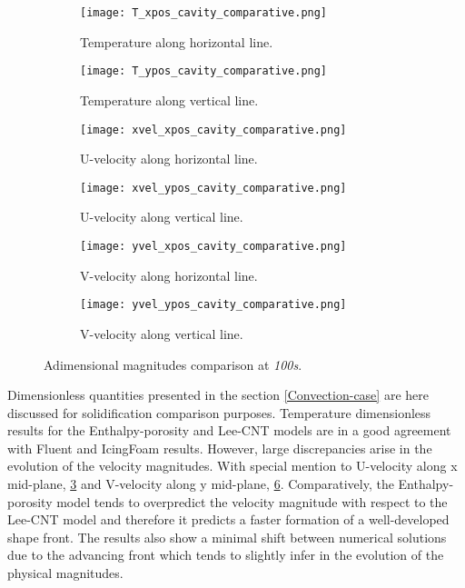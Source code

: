 \begin{figure}[h!]
	\begin{subfigure}{0.50\textwidth}
		\centering
		\texttt{[image: T\_xpos\_cavity\_comparative.png]}\hfill
		\caption{Temperature along horizontal line.} \label{3.13figa}
	\end{subfigure}
	\hfill
	\begin{subfigure}{0.50\textwidth}
		\centering
		\texttt{[image: T\_ypos\_cavity\_comparative.png]}	
		\caption{Temperature along vertical line.}\label{3.13figb}
	\end{subfigure}
	\begin{subfigure}{0.50\textwidth}
		\texttt{[image: xvel\_xpos\_cavity\_comparative.png]}\hfill
		\caption{U-velocity along horizontal line.}\label{3.13figc}
	\end{subfigure}
	\begin{subfigure}{0.50\textwidth}
		\texttt{[image: xvel\_ypos\_cavity\_comparative.png]}	
		\caption{U-velocity along vertical line.}\label{3.13figd}
	\end{subfigure}
	\begin{subfigure}{0.50\textwidth}
		\texttt{[image: yvel\_xpos\_cavity\_comparative.png]}\hfill	
		\caption{V-velocity along horizontal line.}\label{3.13fige}
	\end{subfigure}
	\begin{subfigure}{0.50\textwidth}
		\texttt{[image: yvel\_ypos\_cavity\_comparative.png]}	
		\caption{V-velocity along vertical line.}\label{3.13figf}
	\end{subfigure}
	\caption{Adimensional magnitudes comparison at \textit{100s}.}
	\label{3.13fig}
\end{figure}
\clearpage
\noindent Dimensionless quantities presented in the section \ref{Convection-case} are here discussed for solidification comparison purposes. Temperature dimensionless results for the Enthalpy-porosity and Lee-CNT models are in a good agreement with Fluent and IcingFoam results. However, large discrepancies arise in the evolution of the velocity magnitudes. With special mention to U-velocity along x mid-plane, \ref{3.13figc} and V-velocity along y mid-plane, \ref{3.13figf}. Comparatively, the Enthalpy-porosity model tends to overpredict the velocity magnitude with respect to the Lee-CNT model and therefore it predicts a faster formation of a well-developed shape front. The results also show a minimal shift between numerical solutions due to the advancing front which tends to slightly infer in the evolution of the physical magnitudes.

